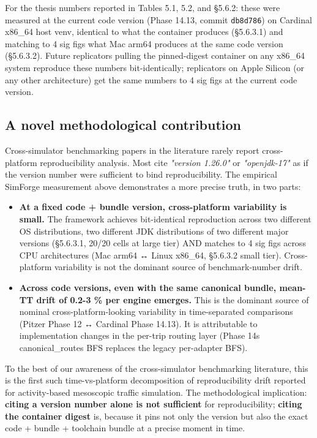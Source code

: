 For the thesis numbers reported in Tables 5.1, 5.2, and §5.6.2: these
were measured at the current code version (Phase 14.13, commit
\texttt{db8d786}) on Cardinal x86\_64 host venv, identical to what the
container produces (§5.6.3.1) and matching to 4 sig figs what Mac arm64
produces at the same code version (§5.6.3.2). Future replicators pulling
the pinned-digest container on any x86\_64 system reproduce these
numbers bit-identically; replicators on Apple Silicon (or any other
architecture) get the same numbers to 4 sig figs at the current code
version.

\subsection{A novel methodological
contribution}\label{a-novel-methodological-contribution}

Cross-simulator benchmarking papers in the literature rarely report
cross-platform reproducibility analysis. Most cite \emph{"version
1.26.0"} or \emph{"openjdk-17"} as if the version number were sufficient
to bind reproducibility. The empirical SimForge measurement above
demonstrates a more precise truth, in two parts:

\begin{itemize}
\tightlist
\item
  \textbf{At a fixed code + bundle version, cross-platform variability
  is small.} The framework achieves bit-identical reproduction across
  two different OS distributions, two different JDK distributions of two
  different major versions (§5.6.3.1, 20/20 cells at large tier) AND
  matches to 4 sig figs across CPU architectures (Mac arm64 ↔ Linux
  x86\_64, §5.6.3.2 small tier). Cross-platform variability is not the
  dominant source of benchmark-number drift.
\item
  \textbf{Across code versions, even with the same canonical bundle,
  mean-TT drift of 0.2-3 \% per engine emerges.} This is the dominant
  source of nominal cross-platform-looking variability in time-separated
  comparisons (Pitzer Phase 12 ↔ Cardinal Phase 14.13). It is
  attributable to implementation changes in the per-trip routing layer
  (Phase 14\textquotesingle s canonical\_routes BFS replaces the legacy
  per-adapter BFS).
\end{itemize}

To the best of our awareness of the cross-simulator benchmarking
literature, this is the first such time-vs-platform decomposition of
reproducibility drift reported for activity-based mesoscopic traffic
simulation. The methodological implication: \textbf{citing a version
number alone is not sufficient} for reproducibility; \textbf{citing the
container digest} is, because it pins not only the version but also the
exact code + bundle + toolchain bundle at a precise moment in time.

